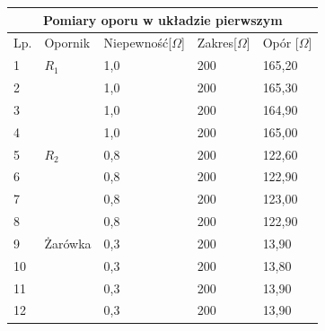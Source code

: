 \documentclass[12pt]{article}
\begin{document}
\begin{tabular}{ |p{0.5cm}|p{2cm}|p{3cm}|p{3cm}|p{3cm}| }
    \hline
    \multicolumn{5}{|c|}{Pomiary oporu w układzie pierwszym} \\
    \hline
    Lp. &Opornik & Niepewność[$\Omega$] & Zakres[$\Omega$] & Opór [$\Omega$] \\ 
    \hline
    1 & $R_1$ & 1,0 & 200 & 165,20  \\
    2 && 1,0 & 200 & 165,30 \\
    3 && 1,0 & 200 & 164,90 \\
    4 && 1,0 & 200 & 165,00 \\
    \hline
    5& $R_2$ & 0,8 & 200 & 122,60\\
    6&& 0,8 & 200 & 122,90 \\
    7&& 0,8 & 200 & 123,00 \\
    8&& 0,8 & 200 & 122,90 \\
    \hline
    9& Żarówka & 0,3 & 200 & 13,90 \\
    10&& 0,3 & 200 & 13,80\\
    11&& 0,3 & 200 & 13,90\\
    12&& 0,3 & 200 & 13,90\\
    \hline
\end{tabular}
\end{document}

